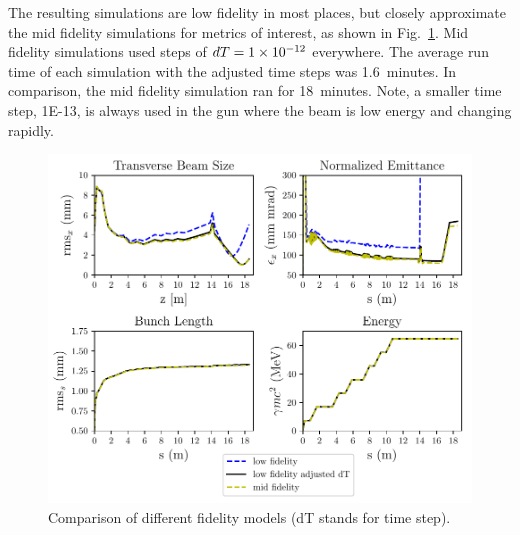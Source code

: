The resulting simulations are low fidelity in most places, but closely approximate 
the mid fidelity simulations for metrics of interest, as shown in 
Fig.~\ref{tstep}.  Mid fidelity simulations used steps of  $dT=\num{1E-12}$ everywhere.
The average run time of each simulation with the adjusted time steps was 1.6~minutes.
In comparison, the mid fidelity simulation ran for 18~minutes.
Note, a smaller time step, \num{1E-13}, is always used in the gun where the 
beam is low energy and changing rapidly.

\begin{figure}%
	\centering
	\includegraphics[width=\linewidth]{Report/timestep_comparison}
	\caption{Comparison of different fidelity models (dT stands for time step).}
	\label{tstep}
\end{figure}

